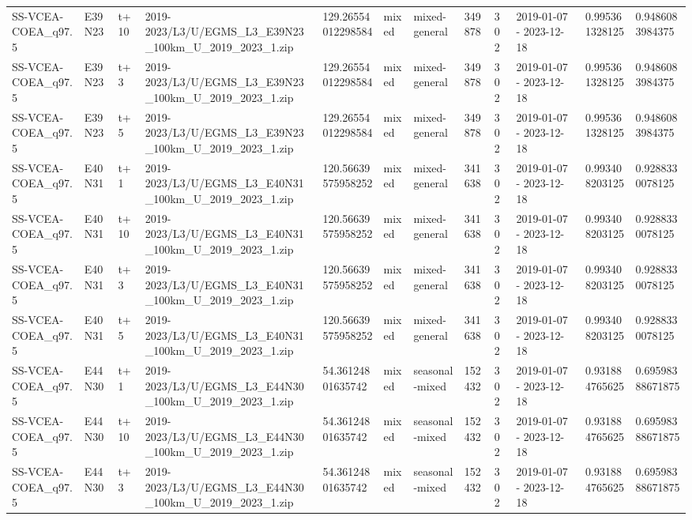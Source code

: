 \begin{landscape}
\begin{longtable}{llllllllllll}
SS-VCEA-COEA\_q97.5 & E39N23 & t+10 & 2019-2023/L3/U/EGMS\_L3\_E39N23\_100km\_U\_2019\_2023\_1.zip & 129.26554012298584 & mixed & mixed-general & 349878 & 302 & 2019-01-07 - 2023-12-18 & 0.995361328125 & 0.9486083984375 \\
SS-VCEA-COEA\_q97.5 & E39N23 & t+3 & 2019-2023/L3/U/EGMS\_L3\_E39N23\_100km\_U\_2019\_2023\_1.zip & 129.26554012298584 & mixed & mixed-general & 349878 & 302 & 2019-01-07 - 2023-12-18 & 0.995361328125 & 0.9486083984375 \\
SS-VCEA-COEA\_q97.5 & E39N23 & t+5 & 2019-2023/L3/U/EGMS\_L3\_E39N23\_100km\_U\_2019\_2023\_1.zip & 129.26554012298584 & mixed & mixed-general & 349878 & 302 & 2019-01-07 - 2023-12-18 & 0.995361328125 & 0.9486083984375 \\
SS-VCEA-COEA\_q97.5 & E40N31 & t+1 & 2019-2023/L3/U/EGMS\_L3\_E40N31\_100km\_U\_2019\_2023\_1.zip & 120.56639575958252 & mixed & mixed-general & 341638 & 302 & 2019-01-07 - 2023-12-18 & 0.993408203125 & 0.9288330078125 \\
SS-VCEA-COEA\_q97.5 & E40N31 & t+10 & 2019-2023/L3/U/EGMS\_L3\_E40N31\_100km\_U\_2019\_2023\_1.zip & 120.56639575958252 & mixed & mixed-general & 341638 & 302 & 2019-01-07 - 2023-12-18 & 0.993408203125 & 0.9288330078125 \\
SS-VCEA-COEA\_q97.5 & E40N31 & t+3 & 2019-2023/L3/U/EGMS\_L3\_E40N31\_100km\_U\_2019\_2023\_1.zip & 120.56639575958252 & mixed & mixed-general & 341638 & 302 & 2019-01-07 - 2023-12-18 & 0.993408203125 & 0.9288330078125 \\
SS-VCEA-COEA\_q97.5 & E40N31 & t+5 & 2019-2023/L3/U/EGMS\_L3\_E40N31\_100km\_U\_2019\_2023\_1.zip & 120.56639575958252 & mixed & mixed-general & 341638 & 302 & 2019-01-07 - 2023-12-18 & 0.993408203125 & 0.9288330078125 \\
SS-VCEA-COEA\_q97.5 & E44N30 & t+1 & 2019-2023/L3/U/EGMS\_L3\_E44N30\_100km\_U\_2019\_2023\_1.zip & 54.36124801635742 & mixed & seasonal-mixed & 152432 & 302 & 2019-01-07 - 2023-12-18 & 0.931884765625 & 0.69598388671875 \\
SS-VCEA-COEA\_q97.5 & E44N30 & t+10 & 2019-2023/L3/U/EGMS\_L3\_E44N30\_100km\_U\_2019\_2023\_1.zip & 54.36124801635742 & mixed & seasonal-mixed & 152432 & 302 & 2019-01-07 - 2023-12-18 & 0.931884765625 & 0.69598388671875 \\
SS-VCEA-COEA\_q97.5 & E44N30 & t+3 & 2019-2023/L3/U/EGMS\_L3\_E44N30\_100km\_U\_2019\_2023\_1.zip & 54.36124801635742 & mixed & seasonal-mixed & 152432 & 302 & 2019-01-07 - 2023-12-18 & 0.931884765625 & 0.69598388671875 \\

\end{longtable}
\end{landscape}
